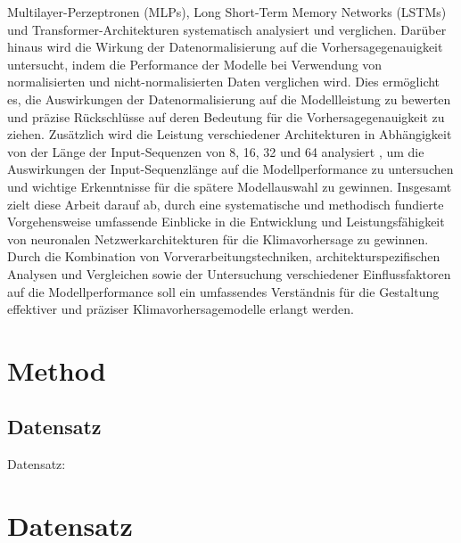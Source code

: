 \documentclass[manuscript,screen,review]{acmart}
\begin{document}
Multilayer-Perzeptronen (MLPs), Long Short-Term Memory Networks (LSTMs) und Transformer-Architekturen systematisch analysiert und verglichen.
Darüber hinaus wird die Wirkung der Datenormalisierung auf die Vorhersagegenauigkeit untersucht, 
indem die Performance der Modelle bei Verwendung von normalisierten und nicht-normalisierten Daten verglichen wird. 
Dies ermöglicht es, die Auswirkungen der Datenormalisierung auf die Modellleistung zu bewerten 
und präzise Rückschlüsse auf deren Bedeutung für die Vorhersagegenauigkeit zu ziehen.
Zusätzlich wird die Leistung verschiedener Architekturen in Abhängigkeit von der Länge der Input-Sequenzen 
von 8, 16, 32 und 64 analysiert , 
um die Auswirkungen der Input-Sequenzlänge auf die Modellperformance zu untersuchen 
und wichtige Erkenntnisse für die spätere Modellauswahl zu gewinnen.
Insgesamt zielt diese Arbeit darauf ab, durch eine systematische und methodisch fundierte Vorgehensweise 
umfassende Einblicke in die Entwicklung und Leistungsfähigkeit von neuronalen Netzwerkarchitekturen für die Klimavorhersage zu gewinnen. Durch die Kombination von Vorverarbeitungstechniken, architekturspezifischen Analysen und Vergleichen sowie der Untersuchung verschiedener Einflussfaktoren auf die Modellperformance soll ein umfassendes Verständnis für die Gestaltung effektiver und präziser Klimavorhersagemodelle erlangt werden.

\section{Method}
\subsection*{Datensatz}
Datensatz: 




\todo[options]{}

\section{Datensatz}
\end{document}
